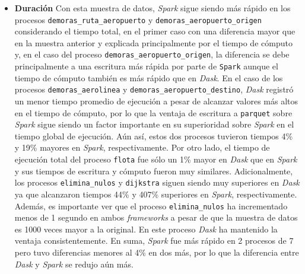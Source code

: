 \begin{itemize}
	\item \textbf{Duración} Con esta muestra de datos, \textit{Spark} sigue siendo más rápido en los procesos \texttt{demoras\_ruta\_aeropuerto} y \texttt{demoras\_aeropuerto\_origen} considerando el tiempo total, en el primer caso con una diferencia mayor que en la muestra anterior y explicada principalmente por el tiempo de cómputo y, en el caso del proceso \texttt{demoras\_aeropuerto\_origen}, la diferencia se debe principalmente a una escritura más rápida por parte de \texttt{Spark} aunque el tiempo de cómputo también es más rápido que en \textit{Dask}. En el caso de los procesos \texttt{demoras\_aerolinea} y \texttt{demoras\_aeropuerto\_destino}, \textit{Dask} registró un menor tiempo promedio de ejecución a pesar de alcanzar valores más altos en el tiempo de cómputo, por lo que la ventaja de escritura a \texttt{parquet} sobre \textit{Spark} sigue siendo un factor importante en su superioridad sobre \textit{Spark} en el tiempo global de ejecución. Aún así, estos dos procesos tuvieron tiempos 4\% y 19\% mayores en \textit{Spark}, respectivamente. Por otro lado, el tiempo de ejecución total del proceso \texttt{flota} fue sólo un 1\% mayor en \textit{Dask} que en \textit{Spark} y sus tiempos de escritura y cómputo fueron muy similares. Adicionalmente, los procesos \texttt{elimina\_nulos} y \texttt{dijkstra} siguen siendo muy superiores en \textit{Dask} ya que alcanzaron tiempos 44\% y 407\% superiores en \textit{Spark}, respectivamente. Además, es importante ver que el proceso \texttt{elimina\_nulos} ha incrementado menos de 1 segundo en ambos \textit{frameworks} a pesar de que la muestra de datos es 1000 veces mayor a la original. En este proceso \textit{Dask} ha mantenido la ventaja consistentemente. En suma, \textit{Spark} fue más rápido en 2 procesos de 7 pero tuvo diferencias menores al 4\% en dos más, por lo que la diferencia entre \textit{Dask} y \textit{Spark} se redujo aún más.

\end{itemize}


